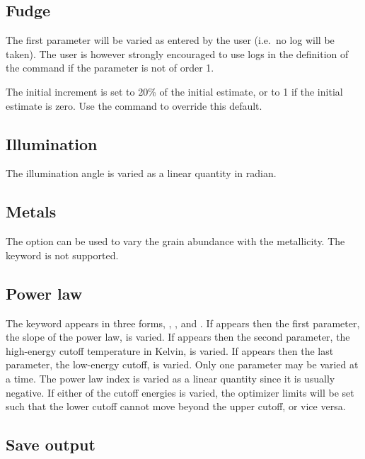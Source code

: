 \subsection{Fudge}

The first parameter will be varied as entered by the user (i.e.\ no log will
be taken). The user is however strongly encouraged to use logs in the
definition of the command if the parameter is not of order 1.

The initial increment is set to 20\% of the initial estimate, or to 1 if the
initial estimate is zero. Use the  command to
override this default.

\subsection{Illumination}

The illumination angle is varied as a linear quantity in radian.

\subsection{Metals}

The  option can be used to vary the
grain abundance with the metallicity. 
The keyword  is not supported.

\subsection{Power law}

The  keyword appears in three forms,
, , and .
If
 appears then the first parameter,
the slope of the power law, is varied.
If  appears then the second parameter,
the high-energy cutoff temperature in
Kelvin, is varied.
If  appears then the last parameter, the low-energy
cutoff, is varied.
Only one parameter may be varied at a time. The power law index is
varied as a linear quantity since it is usually negative.
If either of the cutoff energies is varied, the optimizer limits
will be set such that the lower cutoff cannot move beyond the upper
cutoff, or vice versa.

\subsection{Save output}

